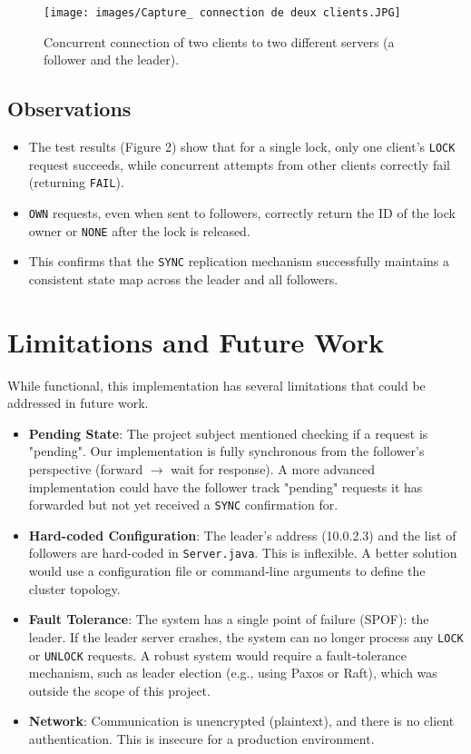 \documentclass[a4paper,11pt]{article}
\begin{document}
\begin{figure}[H]
\centering
\texttt{[image: images/Capture\_ connection de deux clients.JPG]}
\caption{Concurrent connection of two clients to two different servers (a follower and the leader).}
\end{figure}

\subsection*{Observations}
\begin{itemize}
    \item The test results (Figure 2) show that for a single lock, only one client's \texttt{LOCK} request succeeds, while concurrent attempts from other clients correctly fail (returning \texttt{FAIL}).
    \item \texttt{OWN} requests, even when sent to followers, correctly return the ID of the lock owner or \texttt{NONE} after the lock is released.
    \item This confirms that the \texttt{SYNC} replication mechanism successfully maintains a consistent state map across the leader and all followers.
\end{itemize}

\section{Limitations and Future Work}
While functional, this implementation has several limitations that could be addressed in future work.
\begin{itemize}
    \item \textbf{Pending State}: The project subject mentioned checking if a request is "pending". Our implementation is fully synchronous from the follower's perspective (forward $\rightarrow$ wait for response). A more advanced implementation could have the follower track "pending" requests it has forwarded but not yet received a \texttt{SYNC} confirmation for.
    \item \textbf{Hard-coded Configuration}: The leader's address (10.0.2.3) and the list of followers are hard-coded in \texttt{Server.java}. This is inflexible. A better solution would use a configuration file or command-line arguments to define the cluster topology.
    \item \textbf{Fault Tolerance}: The system has a single point of failure (SPOF): the leader. If the leader server crashes, the system can no longer process any \texttt{LOCK} or \texttt{UNLOCK} requests. A robust system would require a fault-tolerance mechanism, such as leader election (e.g., using Paxos or Raft), which was outside the scope of this project.
    \item \textbf{Network}: Communication is unencrypted (plaintext), and there is no client authentication. This is insecure for a production environment.
\end{itemize}
\end{document}
